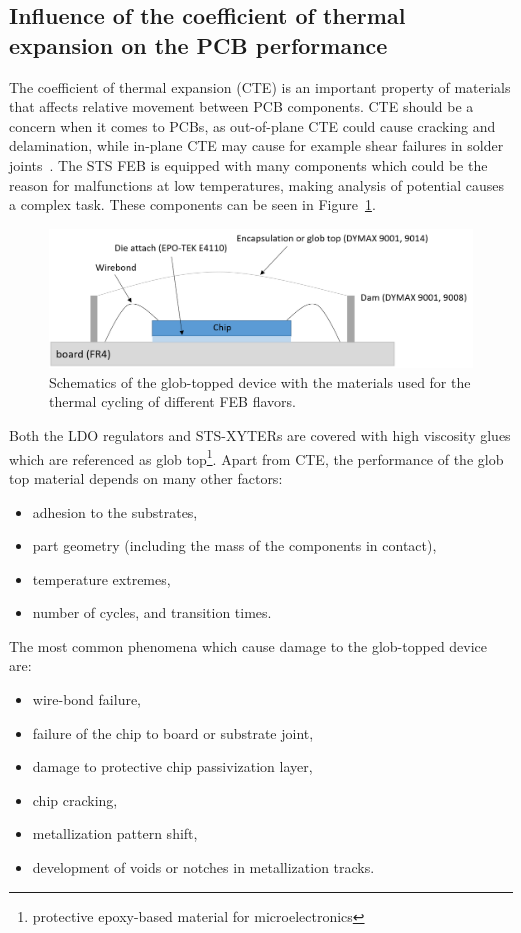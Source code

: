 \subsection{Influence of the coefficient of thermal expansion on the PCB performance}

The coefficient of thermal expansion (\gls{CTE}) is an important property of materials that affects relative movement between \gls{PCB} components. \gls{CTE} should be a concern when it comes to \glspl{PCB}, as out-of-plane \gls{CTE} could cause cracking and delamination, while in-plane \gls{CTE} may cause for example shear failures in solder joints~\cite{cte_report}. The \gls{STS} \gls{FEB} is equipped with many components which could be the reason for malfunctions at low temperatures, making analysis of potential causes a complex task. 
These components can be seen in Figure~\ref{fig_globtop}.
\begin{figure}[!h]
\centering
\includegraphics[width=0.85\columnwidth]{Chapter4/images/glob_topped_device.png}
\caption{Schematics of the glob-topped device with the materials used for the thermal cycling of different FEB flavors.}
\label{fig_globtop}
\end{figure}

Both the \gls{LDO} regulators and STS-XYTERs are covered with high viscosity glues which are referenced as glob top\footnote{protective epoxy-based material for microelectronics}. Apart from \gls{CTE}, the performance of the glob top material depends on many other factors:
\begin{itemize}
    \item adhesion to the substrates,
    \item part geometry (including the mass of the components in contact),
    \item temperature extremes,
    \item number of cycles, and transition times.
\end{itemize}


The most common phenomena which cause damage to the glob-topped device are:
\begin{itemize}
    \item wire-bond failure,
    \item failure of the chip to board or substrate joint,
    \item damage to protective chip passivization layer,
    \item chip cracking,
    \item metallization pattern shift,
    \item development of voids or notches in metallization tracks. 
\end{itemize}


